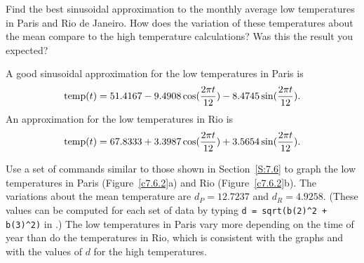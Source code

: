 \documentclass{ximera}
\begin{document}
\begin{exercise} \label{c7.6.2}
Find the best sinusoidal approximation to the monthly average low temperatures
in Paris and Rio de Janeiro.  How does the variation of these temperatures
about the mean compare to the high temperature calculations?  Was this the
result you expected?

\begin{solution}

\ans A good sinusoidal approximation for the low temperatures in Paris
is 
\[ \hbox{temp}(t) = 51.4167 - 9.4908\cos(\frac{2\pi t}{12}) -
8.4745\sin(\frac{2\pi t}{12}). \]
An approximation for the low temperatures in Rio is
\[ \hbox{temp}(t) = 67.8333 + 3.3987\cos(\frac{2\pi t}{12}) +
3.5654\sin(\frac{2\pi t}{12}). \]

\soln Use a set of \Matlab commands similar to those shown in
Section~\ref{S:7.6} to graph the low temperatures in Paris
(Figure~\ref{c7.6.2}a) and Rio (Figure~\ref{c7.6.2}b).  The
variations about the mean temperature are $d_P = 12.7237$ and
$d_R = 4.9258$.  (These values can be computed for each set of data
by typing {\tt d = sqrt(b(2)\^{}2 + b(3)\^{}2)} in \Matlabp.) 
The low temperatures in Paris vary more depending on the time of
year than do the temperatures in Rio, which is consistent with
the graphs and with the values of $d$ for the high temperatures.

\begin{figure}[htb]
		\centerline{%
		}
\end{figure}

\end{solution}
\end{exercise}
\end{document}
